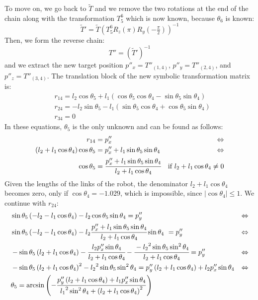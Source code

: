To move on, we go back to $\widetilde{T}$ and we remove the two rotations at the end of the chain along with the transformation $T^6_5$ which is now known, because $\theta_6$ is known:
\[
\widetilde{T}' = \widetilde{T}\left(T^6_5R_z\left(\pi\right)R_y(-\tfrac{\pi}{2})\right)^{-1}
\]
Then, we form the reverse chain: 
\[
T'' = \left( \widetilde{T}' \right) ^{-1}
\]
and we extract the new target position $p''_x = T''_{(1,4)}$, $p''_y = T''_{(2,4)}$, and $p''_z = T''_{(3,4)}$. The translation block of the new symbolic transformation matrix is:
\begin{align*}
&r_{14} = l_2\cos\theta_5 + l_1\left(\cos\theta_5\cos\theta_4 - \sin\theta_5\sin\theta_4\right)\\
&r_{24} = -l_2\sin\theta_5 - l_1\left(\sin\theta_5\cos\theta_4 + \cos\theta_5\sin\theta_4\right)\\
&r_{34} = 0
\end{align*}
In these equations, $\theta_5$ is the only unknown and can be found as follows:
\begin{align*}
r_{14} &= p''_x & \Leftrightarrow\\
\left(l_2+l_1\cos\theta_4\right) \cos\theta_5 &= p''_x + l_1\sin\theta_5\sin\theta_4 & \Leftrightarrow\\
\cos\theta_5 &= \cfrac{p''_x + l_1\sin\theta_5\sin\theta_4}{l_2+l_1\cos\theta_4}&\text{if }l_2+l_1\cos\theta_4\neq0\\
\end{align*}
Given the lengths of the links of the robot, the denominator $l_2+l_1\cos\theta_4$ becomes zero, only if $\cos\theta_4 = -1.029$, which is impossible, since $|\cos\theta_4| \le 1$. We continue with $r_{24}$: 
\begin{align*}
&\sin\theta_5\left(-l_2-l_1\cos\theta_4\right) - l_2\cos\theta_5\sin\theta_4 = p''_y& \Leftrightarrow\\
&\sin\theta_5\left(-l_2-l_1\cos\theta_4\right) - l_2\cfrac{p''_x + l_1\sin\theta_5\sin\theta_4}{l_2+l_1\cos\theta_4}\sin\theta_4\ =p''_y & \Leftrightarrow\\
&-\sin\theta_5\left(l_2+l_1\cos\theta_4\right) - \cfrac{l_2p''_x\sin\theta_4}{l_2+l_1\cos\theta_4} - \cfrac{-{l_2}^2\sin\theta_5\sin^2\theta_4}{l_2+l_1\cos\theta_4} = p''_y&\Leftrightarrow\\
&-\sin\theta_5\left(l_2+l_1\cos\theta_4\right)^2 - {l_2}^2\sin\theta_5\sin^2\theta_4 = p''_y\left(l_2+l_1\cos\theta_4\right) + l_2p''_x\sin\theta_4 & \Leftrightarrow\\
&\theta_5 = \arcsin\left(-\frac{p''_y\left(l_2+l_1\cos\theta_4\right) + l_1p''_x\sin\theta_4}{{l_1}^2\sin^2\theta_4 + \left(l_2 + l_1\cos\theta_4\right)^2}\right)
\end{align*}
